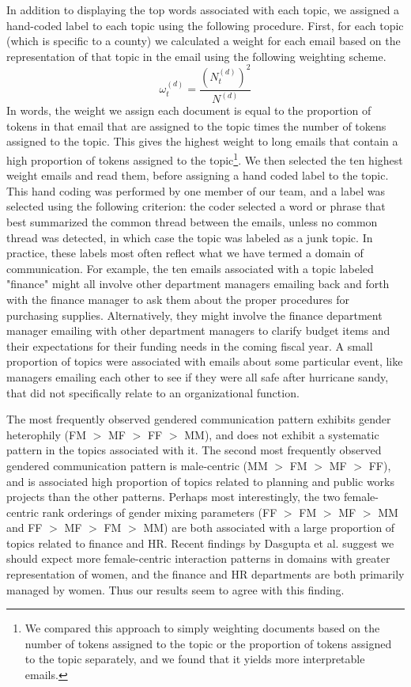 \documentclass{pnastwo}
\begin{document}
\begin{article}
In addition to displaying the top words associated with each topic, we assigned a hand-coded label to each topic using the following procedure. First, for each topic (which is specific to a county) we calculated a weight for each email based on the representation of that topic in the email using the following weighting scheme.
\begin{equation}
	\omega_t^{(d)} = \frac{\left(N_t^{(d)}\right)^2}{N^{(d)}}
\end{equation}
In words, the weight we assign each document is equal to the proportion of tokens in that email that are assigned to the topic times the number of tokens assigned to the topic. This gives the highest weight to long emails that contain a high proportion of tokens assigned to the topic\footnote{We compared this approach to simply weighting documents based on the number of tokens assigned to the topic or the proportion of tokens assigned to the topic separately, and we found that it yields more interpretable emails.}. We then selected the ten highest weight emails and read them, before assigning a hand coded label to the topic. This hand coding was performed by one member of our team, and a label was selected using the following criterion: the coder selected a word or phrase that best summarized the common thread between the emails, unless no common thread was detected, in which case the topic was labeled as a junk topic. In practice, these labels most often reflect what we have termed a domain of communication. For example, the ten emails associated with a topic labeled "finance" might all involve other department managers emailing back and forth with the finance manager to ask them about the proper procedures for purchasing supplies. Alternatively, they might involve the finance department manager emailing with other department managers to clarify budget items and their expectations for their funding needs in the coming fiscal year. A small proportion of topics were associated with emails about some particular event, like managers emailing each other to see if they were all safe after hurricane sandy, that did not specifically relate to an organizational function. 

The most frequently observed gendered communication pattern exhibits gender heterophily (FM $>$  MF $>$ FF $>$ MM), and does not exhibit a systematic pattern in the topics associated with it. The second most frequently observed gendered communication pattern is male-centric (MM $>$ FM $>$ MF $>$ FF), and is associated high proportion of topics related to planning and public works projects than the other patterns. Perhaps most interestingly, the two female-centric rank orderings of gender mixing parameters (FF $>$ FM $>$ MF $>$ MM and FF $>$ MF $>$ FM $>$ MM) are both associated with a large proportion of topics related to finance and HR. Recent findings by Dasgupta et al. \cite{Dasgupta2015} suggest we should expect more female-centric interaction patterns in domains with greater representation of women, and the finance and HR departments are both primarily managed by women. Thus our results seem to agree with this finding.


\end{article}
\end{document}
